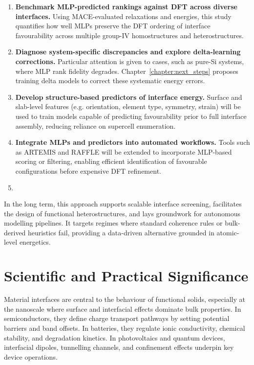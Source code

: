 \begin{enumerate}
    \item \textbf{Benchmark MLP-predicted rankings against DFT across diverse interfaces.} Using MACE-evaluated relaxations and energies, this study quantifies how well MLPs preserve the DFT ordering of interface favourability across multiple group-IV homostructures and heterostructures.
    \item \textbf{Diagnose system-specific discrepancies and explore delta-learning corrections.} Particular attention is given to cases, such as pure-Si systems, where MLP rank fidelity degrades. Chapter~\ref{chapter:next_steps} proposes training delta models to correct these systematic energy errors.
    \item \textbf{Develop structure-based predictors of interface energy.} Surface and slab-level features (e.g. orientation, element type, symmetry, strain) will be used to train models capable of predicting favourability prior to full interface assembly, reducing reliance on supercell enumeration.
    \item \textbf{Integrate MLPs and predictors into automated workflows.} Tools such as ARTEMIS and RAFFLE will be extended to incorporate MLP-based scoring or filtering, enabling efficient identification of favourable configurations before expensive DFT refinement.
\item \end{enumerate}

In the long term, this approach supports scalable interface screening, facilitates the design of functional heterostructures, and lays groundwork for autonomous modelling pipelines. It targets regimes where standard coherence rules or bulk-derived heuristics fail, providing a data-driven alternative grounded in atomic-level energetics. 

\section{Scientific and Practical Significance} \label{section:scientific_and_practical_significance} 

Material interfaces are central to the behaviour of functional solids, especially at the nanoscale where surface and interfacial effects dominate bulk properties. In semiconductors, they define charge transport pathways by setting potential barriers and band offsets. In batteries, they regulate ionic conductivity, chemical stability, and degradation kinetics. In photovoltaics and quantum devices, interfacial dipoles, tunnelling channels, and confinement effects underpin key device operations. 

